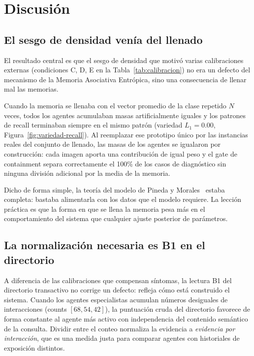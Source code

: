 \section{Discusión}
\label{sec:discusion}

\subsection{El sesgo de densidad venía del llenado}
\label{sec:disc-sesgo}

El resultado central es que el sesgo de densidad que motivó varias calibraciones externas (condiciones C, D, E en la Tabla~\ref{tab:calibracion}) no era un defecto del mecanismo de la Memoria Asociativa Entrópica, sino una consecuencia de llenar mal las memorias.

Cuando la memoria se llenaba con el vector promedio de la clase repetido $N$ veces, todos los agentes acumulaban masas artificialmente iguales y los patrones de recall terminaban siempre en el mismo patrón (variedad $L_1 = 0.00$, Figura~\ref{fig:variedad-recall}).
Al reemplazar ese prototipo único por las instancias reales del conjunto de llenado, las masas de los agentes se igualaron por construcción: cada imagen aporta una contribución de igual peso y el gate de containment separa correctamente el 100\% de los casos de diagnóstico sin ninguna división adicional por la media de la memoria.

Dicho de forma simple, la teoría del modelo de Pineda y Morales~\cite{pineda2021entropic} estaba completa: bastaba alimentarla con los datos que el modelo requiere.
La lección práctica es que la forma en que se llena la memoria pesa más en el comportamiento del sistema que cualquier ajuste posterior de parámetros.

\subsection{La normalización necesaria es B1 en el directorio}
\label{sec:disc-b1}

A diferencia de las calibraciones que compensan síntomas, la lectura B1 del directorio transactivo no corrige un defecto: refleja cómo está construido el sistema.
Cuando los agentes especialistas acumulan números desiguales de interacciones (counts $[68, 54, 42]$), la puntuación cruda del directorio favorece de forma constante al agente más activo con independencia del contenido semántico de la consulta.
Dividir entre el conteo normaliza la evidencia a \textit{evidencia por interacción}, que es una medida justa para comparar agentes con historiales de exposición distintos.

